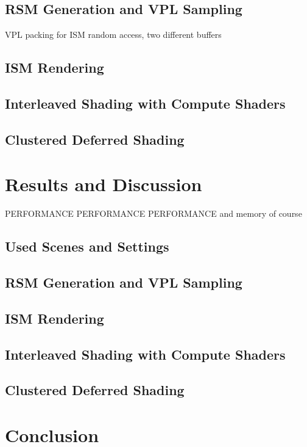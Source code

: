 \section{RSM Generation and VPL Sampling}
VPL packing for ISM random access, two different buffers

\section{ISM Rendering}

\section{Interleaved Shading with Compute Shaders}

\section{Clustered Deferred Shading}




\chapter{Results and Discussion}

PERFORMANCE PERFORMANCE PERFORMANCE
and memory of course
\section{Used Scenes and Settings}

\section{RSM Generation and VPL Sampling}

\section{ISM Rendering}

\section{Interleaved Shading with Compute Shaders}

\section{Clustered Deferred Shading}





\chapter{Conclusion}
